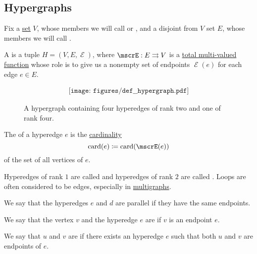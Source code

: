 \subsection{Hypergraphs}\label{subsec:hypergraphs}

\begin{definition}\label{def:hypergraph}
  Fix a \hyperref[def:set]{set} \( V \), whose members we will call  or , and a disjoint from \( V \) set \( E \), whose members we will call .

  A  is a tuple \( H = (V, E, \mscrE) \), where \( \mscrE: E \multto V \) is a \hyperref[def:multi_valued_function/total]{total multi-valued function} whose role is to give us a nonempty set of endpoints \( \mscrE(e) \) for each edge \( e \in E \).

  \begin{figure}[h]
    \begin{equation}\label{eq:fig:def:hypergraph}
      \begin{aligned}
        \texttt{[image: figures/def\_\_hypergraph.pdf]}
      \end{aligned}
    \end{equation}
    \caption{A hypergraph containing four hyperedges of rank two and one of rank four.}\label{fig:def:hypergraph}
  \end{figure}

  \begin{thmenum}
     The  of a hyperedge \( e \) is the \hyperref[thm:cardinality_existence]{cardinality}
    \begin{equation*}
      \card(e) \coloneqq \card(\mscrE(e))
    \end{equation*}
    of the set of all vertices of \( e \).

    Hyperedges of rank \( 1 \) are called  and hyperedges of rank \( 2 \) are called . Loops are often considered to be edges, especially in \hyperref[def:undirected_multigraph]{multigraphs}.

     We say that the hyperedges \( e \) and \( d \) are parallel if they have the same endpoints.

     We say that the vertex \( v \) and the hyperedge \( e \) are  if \( v \) is an endpoint \( e \).

     We say that \( u \) and \( v \) are  if there exists an hyperedge \( e \) such that both \( u \) and \( v \) are endpoints of \( e \).


\end{thmenum}
\end{definition}
